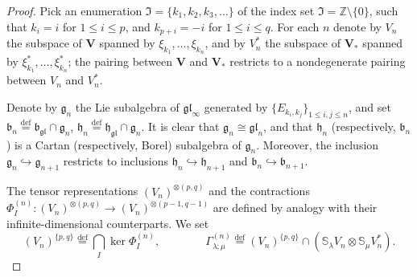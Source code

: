 \documentclass[12pt,reqno]{amsart}
\numberwithin{equation}{section}
\theoremstyle{plain}
\theoremstyle{definition}
\def\Z{\mathbb Z}
\def\bydef{\overset{\mathrm {def}}=}
\def\gl{\mathfrak{gl}}
\def\o{\otimes}
\def\g{\mathfrak g}
\def\b{\mathfrak b}
\def\h{\mathfrak h}
\def\SS{\mathbb S}
\def\VV{\mathbf V}
\begin{document}
\begin{proof}
Pick an enumeration $\mathfrak I = \{k_1,k_2,k_3,\dots\}$ of the
index set $\mathfrak I = \Z\setminus \{0\}$, such that $k_i = i$ for
$1\le i \le p$, and $k_{p+i} = -i$ for $1\le i\le q$. For each $n$
denote by $V_n$ the subspace of $\VV$ spanned by
$\xi_{k_1},\dots,\xi_{k_n}$, and by $V_n^*$ the subspace of
$\VV_*$ spanned by $\xi_{k_1}^*,\dots,\xi_{k_n}^*$; the pairing
between $\VV$ and $\VV_*$ restricts to a nondegenerate pairing
between $V_n$ and $V_n^*$.

Denote by $\g_n$ the Lie subalgebra of $\gl_\infty$ generated by
$\{E_{k_i,k_j}\}_{1\le i,j\le n}$, and set $\b_n \bydef \b_\gl \cap
\g_n$, $\h_n \bydef \h_\gl \cap \g_n$. It is clear that $\g_n \cong
\gl_n$, and that $\h_n$ (respectively, $\b_n$) is a Cartan (respectively, Borel) subalgebra of
$\g_n$. Moreover, the inclusion $\g_n \hookrightarrow \g_{n+1}$
restricts to inclusions $\h_n \hookrightarrow \h_{n+1}$ and $\b_n \hookrightarrow \b_{n+1}$.

The tensor representations $(V_n)^{\o(p,q)}$ and the contractions
$\Phi_I^{(n)}: (V_n)^{\o(p,q)} \to (V_n)^{\o(p-1,q-1)}$ are defined
by analogy with their infinite-dimensional counterparts. We set
\begin{equation*}
    (V_n)^{\{p,q\}} \bydef \bigcap_{I} \ker \Phi_{I}^{(n)},
    \qquad\qquad
    \varGamma_{\lambda;\mu}^{(n)} \bydef  (V_n)^{ \{p,q\} } \cap (\SS_\lambda V_n \o \SS_\mu V_n^*).
\end{equation*}


\end{proof}
\end{document}
